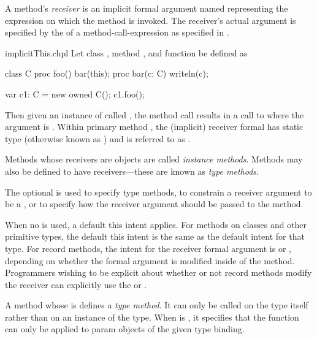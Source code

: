 A method's \emph{receiver} is an implicit formal argument
named  representing the expression on which the method is
invoked.  The receiver's actual argument is specified by the
 of a method-call-expression as specified
in .




\begin{chapelexample}{implicitThis.chpl}
Let class , method , and function  be
defined as
\begin{chapel}
class C {
  proc foo() {
    bar(this);
  }
}
proc bar(c: C) { writeln(c); }
\end{chapel}
\begin{chapelpost}
var c1: C = new owned C();
c1.foo();
\end{chapelpost}
\begin{chapeloutput}
{}
\end{chapeloutput}
Then given an instance of  called , the method
call  results in a call to  where the
argument is .  Within primary method , the
(implicit) receiver formal has static type  (otherwise known as
) and is referred to as .
\end{chapelexample}

Methods whose receivers are objects are called \emph{instance
methods}.  Methods may also be defined to have 
receivers---these are known as \emph{type methods}.

The optional  is used to specify type methods, to
constrain a receiver argument to be a , or to specify how
the receiver argument should be passed to the method.

When no  is used, a default this intent applies. For
methods on classes and other primitive types, the default this intent is
the same as the default intent for that type.
For record methods, the intent for the receiver formal argument is 
or , depending on whether the formal argument is modified
inside of the method. Programmers wishing to be explicit about whether or
not record methods modify the receiver can explicitly use the 
or  .

A method whose  is  defines a \emph{type
method}.  It can only be called on the type itself rather than on an
instance of the type.  When  is , it
specifies that the function can only be applied to param objects of
the given type binding.

